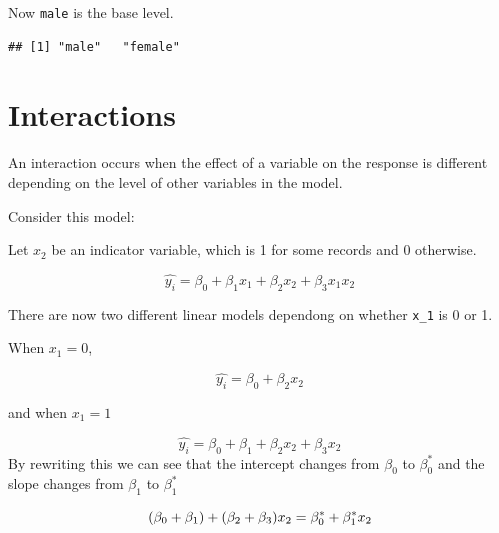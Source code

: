 \documentclass[]{book}
\newenvironment{Shaded}{\begin{snugshade}}{\end{snugshade}}
\newcommand{\DataTypeTok}[1]{\textcolor[rgb]{0.13,0.29,0.53}{#1}}
\newcommand{\KeywordTok}[1]{\textcolor[rgb]{0.13,0.29,0.53}{\textbf{#1}}}
\newcommand{\NormalTok}[1]{#1}
\newcommand{\OperatorTok}[1]{\textcolor[rgb]{0.81,0.36,0.00}{\textbf{#1}}}
\newcommand{\StringTok}[1]{\textcolor[rgb]{0.31,0.60,0.02}{#1}}
\begin{document}
\begin{Shaded}
\end{Shaded}

Now \texttt{male} is the base level.

\begin{Shaded}
\end{Shaded}

\begin{verbatim}
## [1] "male"   "female"
\end{verbatim}

\hypertarget{interactions}{%
\section{Interactions}\label{interactions}}

An interaction occurs when the effect of a variable on the response is different depending on the level of other variables in the model.

Consider this model:

Let \(x_2\) be an indicator variable, which is 1 for some records and 0 otherwise.

\[\hat{y_i} = \beta_0 + \beta_1 x_1 + \beta_2 x_2 + \beta_3 x_1 x_2\]

There are now two different linear models dependong on whether \texttt{x\_1} is 0 or 1.

When \(x_1 = 0\),

\[\hat{y_i} = \beta_0  + \beta_2 x_2\]

and when \(x_1 = 1\)

\[\hat{y_i} = \beta_0 + \beta_1 + \beta_2 x_2 + \beta_3 x_2\]
By rewriting this we can see that the intercept changes from \(\beta_0\) to \(\beta_0^*\) and the slope changes from \(\beta_1\) to \(\beta_1^*\)

\[
(\beta_0 + \beta_1) + (\beta_2 + \beta_3 ) x_2 \\
 = \beta_0^* + \beta_1^* x_2
\]
\end{document}
